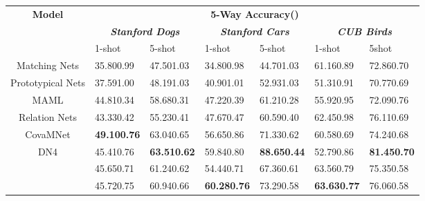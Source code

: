 \documentclass[final]{cvpr}
\begin{document}
	\begin{table*}
		\centering
		\begin{tabular}{c  p{1.8cm}<{\centering}  p{1.8cm}<{\centering}  p{1.8cm}<{\centering}  p{1.8cm}<{\centering}  p{1.8 cm}<{\centering}  p{1.8cm}<{\centering} }
			\toprule
			\multirow{3}{*}{\textbf{Model}} & \multicolumn{6}{c}{\textbf{5-Way Accuracy()}}
			\\
			\cmidrule{2-7}
			&\multicolumn{2}{c}{\emph{\textbf{Stanford Dogs}}} &\multicolumn{2}{c}{\emph{\textbf{Stanford Cars}}} 
			&\multicolumn{2}{c}{\emph{\textbf{CUB Birds}}} \\
			& 1-shot& 5-shot & 1-shot & 5-shot & 1-shot & 5shot\\
			\midrule Matching Nets \cite{vinyals2016matching} & 35.80\footnotesize{0.99} & 47.50\footnotesize{1.03}  & 34.80\footnotesize{0.98} & 44.70\footnotesize{1.03}  & 61.16\footnotesize{0.89} & 72.86\footnotesize{0.70} \\
			Prototypical Nets \cite{snell2017prototypical}& 37.59\footnotesize{1.00} & 48.19\footnotesize{1.03}  & 40.90\footnotesize{1.01} & 52.93\footnotesize{1.03} & 51.31\footnotesize{0.91} & 70.77\footnotesize{0.69}  \\
MAML \cite{finn2017model} & 44.81\footnotesize{0.34} & 58.68\footnotesize{0.31} &47.22\footnotesize{0.39} & 61.21\footnotesize{0.28} & 55.92\footnotesize{0.95}  &  72.09\footnotesize{0.76} \\
			Relation Nets \cite{sung2018learning} & 43.33\footnotesize{0.42} & 55.23\footnotesize{0.41} & 47.67\footnotesize{0.47}  & 60.59\footnotesize{0.40} & 62.45\footnotesize{0.98}  & 76.11\footnotesize{0.69} \\
CovaMNet  \cite{li2019distribution} & \textbf{49.10}\textbf{\footnotesize{0.76}}  & 63.04\footnotesize{0.65} & 56.65\footnotesize{0.86} & 71.33\footnotesize{0.62}  & 60.58\footnotesize{0.69} & 74.24\footnotesize{0.68} \\
			DN4  \cite{li2019revisiting} & 45.41\footnotesize{0.76} & \textbf{63.51}\textbf{\footnotesize{0.62}}  & 59.84\footnotesize{0.80} & \textbf{88.65}\textbf{\footnotesize{0.44}}  & 52.79\footnotesize{0.86} & \textbf{81.45}\textbf{\footnotesize{0.70}}  \\
			\midrule
			 \cite{huang2020low} & 45.65\footnotesize{0.71} & 61.24\footnotesize{0.62} & 54.44\footnotesize{0.71}  & 67.36\footnotesize{0.61}  & 63.56\footnotesize{0.79} & 75.35\footnotesize{0.58} \\
			 \cite{huang2020low} & 45.72\footnotesize{0.75} & 60.94\footnotesize{0.66} & \textbf{60.28}\textbf{\footnotesize{0.76}} & 73.29\footnotesize{0.58} & \textbf{63.63}\textbf{\footnotesize{0.77}} & 76.06\footnotesize{0.58} \\		

\end{tabular}
\end{table*}
\end{document}
